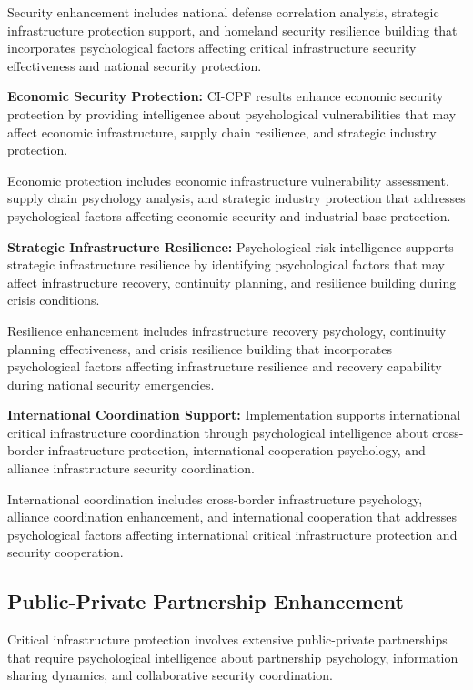 \documentclass[10pt, twocolumn]{article}
\begin{document}
Security enhancement includes national defense correlation analysis, strategic infrastructure protection support, and homeland security resilience building that incorporates psychological factors affecting critical infrastructure security effectiveness and national security protection.

\textbf{Economic Security Protection:} CI-CPF results enhance economic security protection by providing intelligence about psychological vulnerabilities that may affect economic infrastructure, supply chain resilience, and strategic industry protection.

Economic protection includes economic infrastructure vulnerability assessment, supply chain psychology analysis, and strategic industry protection that addresses psychological factors affecting economic security and industrial base protection.

\textbf{Strategic Infrastructure Resilience:} Psychological risk intelligence supports strategic infrastructure resilience by identifying psychological factors that may affect infrastructure recovery, continuity planning, and resilience building during crisis conditions.

Resilience enhancement includes infrastructure recovery psychology, continuity planning effectiveness, and crisis resilience building that incorporates psychological factors affecting infrastructure resilience and recovery capability during national security emergencies.

\textbf{International Coordination Support:} Implementation supports international critical infrastructure coordination through psychological intelligence about cross-border infrastructure protection, international cooperation psychology, and alliance infrastructure security coordination.

International coordination includes cross-border infrastructure psychology, alliance coordination enhancement, and international cooperation that addresses psychological factors affecting international critical infrastructure protection and security cooperation.

\subsection{Public-Private Partnership Enhancement}

Critical infrastructure protection involves extensive public-private partnerships that require psychological intelligence about partnership psychology, information sharing dynamics, and collaborative security coordination.
\end{document}
